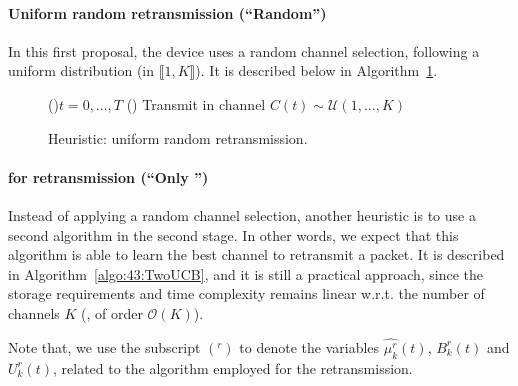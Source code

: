 \paragraph{Uniform random retransmission (``Random'')}\label{sub:43:UCBthenRandom}

In this first proposal, the device uses a random channel selection, following a uniform distribution (in $\llbracket 1, K \rrbracket$).
It is described below in Algorithm~\ref{algo:43:UCBthenRandom}.

\vspace*{-3pt}
\begin{figure}[h!]
	\centering
	\begin{algorithm}[H]
	\For(){$t = 0, \dots, T$}{
			\Else(){
				Transmit in channel $C(t) \sim \mathcal{U}(1,\ldots,K)$\;
			}
		}
		\caption{Heuristic: uniform random retransmission.}    %
		\label{algo:43:UCBthenRandom}
\end{algorithm}
\end{figure}


\paragraph{\UCB{} for retransmission (``Only \UCB{}'')}\label{sub:43:TwoUCB}

Instead of applying a random channel selection,
another heuristic is to use a second \UCB{} algorithm in the second stage.
In other words, we expect that this algorithm is able to learn the best channel to retransmit a packet.
It is described in Algorithm~\ref{algo:43:TwoUCB}, and it is still a practical approach, since the storage requirements and time complexity remains linear w.r.t. the number of channels $K$ (\ie, of order $\mathcal{O}(K)$).

Note that, we use the subscript $({}^r)$ to denote the variables
$\widehat{\mu^r_k}(t)$, $B^r_k(t)$ and $U^r_k(t)$,
related to the \UCB{} algorithm employed for the retransmission.

